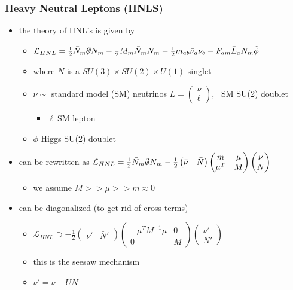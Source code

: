 \documentclass[
	11pt, %
]{beamer}
\begin{document}
\begin{frame}
\frametitle{Heavy Neutral Leptons (HNLS)}
	\begin{itemize}
		\item the theory of HNL's is given by
		\begin{itemize}
			\item $\mathcal{L}_{HNL} = \frac{1}{2} \bar{N}_m \slashed{\partial}N_m - \frac{1}{2} M_m \bar{N}_m N_m - \frac{1}{2} m_{ab} \bar{\nu}_a \nu_b - F_{am} \bar{L}_a N_m \tilde{\phi}$
		\end{itemize}
			\begin{itemize}
				\item where $N$ is a $SU(3) \times SU(2) \times U(1)$ singlet 
				\item $\nu \sim$ standard model (SM) neutrinos
				$L = \begin{pmatrix} \nu \\ \ell \end{pmatrix},\,\,$ SM SU(2) doublet
					\begin{itemize}
					\item  $\ell ~ $SM lepton
					\end{itemize}
				\item $\phi$ Higgs SU(2) doublet
			\end{itemize}
		\item can be rewritten as $\mathcal{L}_{HNL}= \frac{1}{2} \bar{N}_m \slashed{\partial} N_m - \frac{1}{2} \begin{pmatrix} \bar{\nu} & \bar{N} \end{pmatrix} \begin{pmatrix} m & \mu \\ \mu^T & M \end{pmatrix} \begin{pmatrix} \nu \\ N \end{pmatrix}$
			\begin{itemize}
				\item we assume $M>>\mu>>m \approx 0$
			\end{itemize}
		\item can be diagonalized (to get rid of cross terms)
		\begin{itemize}
			\item $\mathcal{L}_{HNL} \supset - \frac{1}{2} \begin{pmatrix} \bar{\nu}' & \bar{N}' \end{pmatrix} \begin{pmatrix} -\mu^T M^{-1} \mu & 0 \\ 0 & M \end{pmatrix} \begin{pmatrix} \nu' \\ N' \end{pmatrix}$
			\item this is the seesaw mechanism
			\item $\nu' = \nu - U N$
		\end{itemize}
	\end{itemize}
\end{frame}
\end{document}
